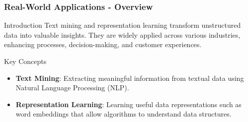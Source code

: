 \documentclass[aspectratio=169]{beamer}
\begin{document}
\begin{frame}[fragile]
    \frametitle{Real-World Applications - Overview}
    \begin{block}{Introduction}
        Text mining and representation learning transform unstructured data into valuable insights. They are widely applied across various industries, enhancing processes, decision-making, and customer experiences.
    \end{block}
    
    \begin{block}{Key Concepts}
        \begin{itemize}
            \item \textbf{Text Mining}: Extracting meaningful information from textual data using Natural Language Processing (NLP).
            \item \textbf{Representation Learning}: Learning useful data representations such as word embeddings that allow algorithms to understand data structures.
        \end{itemize}
    \end{block}
\end{frame}
\end{document}
